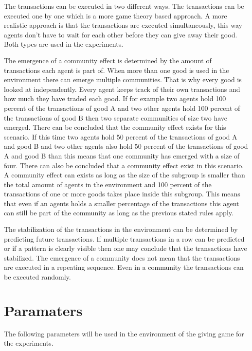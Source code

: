 \documentclass[twoside,openright]{uva-bachelor-thesis}
\begin{document}
The transactions can be executed in two different ways. The transactions can be executed one by one which is a more game theory based approach. A more realistic approach is that the transactions are executed simultaneously, this way agents don’t have to wait for each other before they can give away their good. Both types are used in the experiments.

The emergence of a community effect is determined by the amount of transactions each agent is part of. When more than one good is used in the environment there can emerge multiple communities. That is why every good is looked at independently. Every agent keeps track of their own transactions and how much they have traded each good. If for example two agents hold 100 percent of the transactions of good A and two other agents hold 100 percent of the transactions of good B then two separate communities of size two have emerged. There can be concluded that the community effect exists for this scenario. If this time two agents hold 50 percent of the transactions of good A and good B and two other agents also hold 50 percent of the transactions of good A and good B than this means that one community has emerged with a size of four. There can also be concluded that a community effect exist in this scenario.  A community effect can exists as long as the size of the subgroup is smaller than the total amount of agents in the environment and 100 percent of the transactions of one or more goods takes place inside this subgroup. This means that even if an agents holds a smaller percentage of the transactions this agent can still be part of the community as long as the previous stated rules apply.

The stabilization of the transactions in the environment can be determined by predicting future transactions. If multiple transactions in a row can be predicted or if a pattern is clearly visible then one may conclude that the transactions have stabilized. The emergence of a community does not mean that the transactions are executed in a repeating sequence. Even in a community the transactions can be executed randomly.


\section{Paramaters}
The following parameters will be used in the environment of the giving game for the experiments.
\end{document}
